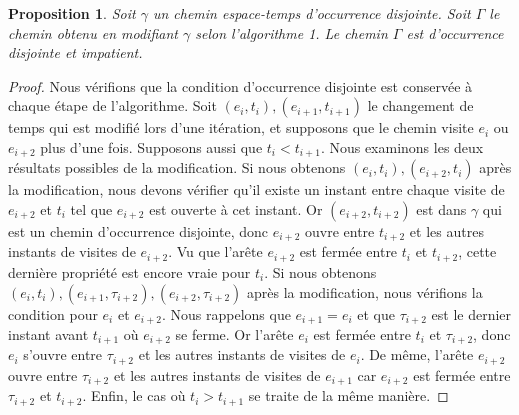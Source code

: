 \documentclass[titlepage,a4paper,12pt]{article}
\newcounter{d}
\newcounter{t}
\newcounter{p}
\newcounter{c}
\newcounter{a}
\newcounter{l}
\newtheorem{prop}[p]{Proposition}
\begin{document}
\begin{prop} \label{imp}Soit $\gamma$ un chemin espace-temps d'occurrence disjointe. Soit $\Gamma$ le chemin obtenu en modifiant $\gamma$ selon l'algorithme 1. Le chemin $\Gamma$ est d'occurrence disjointe et impatient.
\end{prop}
\begin{proof}
Nous vérifions que la condition d'occurrence disjointe est conservée à chaque étape de l'algorithme. Soit $(e_i,t_i),(e_{i+1},t_{i+1})$ le changement de temps qui est modifié lors d'une itération, et supposons que le chemin visite $e_i$ ou $e_{i+2}$ plus d'une fois. Supposons aussi que $t_i< t_{i+1}$. Nous examinons les deux résultats possibles de la modification. Si nous obtenons $(e_i,t_i),(e_{i+2},t_i)$ après la modification, nous devons vérifier qu'il existe un instant entre chaque visite de $e_{i+2}$ et $t_i$ tel que $e_{i+2}$ est ouverte à cet instant. Or $(e_{i+2},t_{i+2})$ est dans $\gamma$ qui est un chemin d'occurrence disjointe, donc $e_{i+2}$ ouvre entre $t_{i+2}$ et les autres instants de visites de $e_{i+2}$. Vu que l'arête $e_{i+2}$ est fermée entre $t_i$ et $t_{i+2}$, cette dernière propriété est encore vraie pour $t_i$. Si nous obtenons $(e_i,t_i),(e_{i+1},\tau_{i+2}),(e_{i+2},\tau_{i+2})$ après la modification, nous vérifions la condition pour $e_i$ et $e_{i+2}$. Nous rappelons que $e_{i+1}= e_i$ et que $\tau_{i+2}$ est le dernier instant avant $t_{i+1}$ où $e_{i+2}$ se ferme. Or l'arête $e_i$ est fermée entre $t_i$ et $\tau_{i+2}$, donc $e_i$ s'ouvre entre $\tau_{i+2}$ et les autres instants de visites de $e_i$. De même, l'arête $e_{i+2}$ ouvre entre $\tau_{i+2}$ et les autres instants de visites de $e_{i+1}$ car $e_{i+2}$ est fermée entre $\tau_{i+2}$ et $t_{i+2}$. Enfin, le cas où $t_i> t_{i+1}$ se traite de la même manière.
\end{proof}
\end{document}
